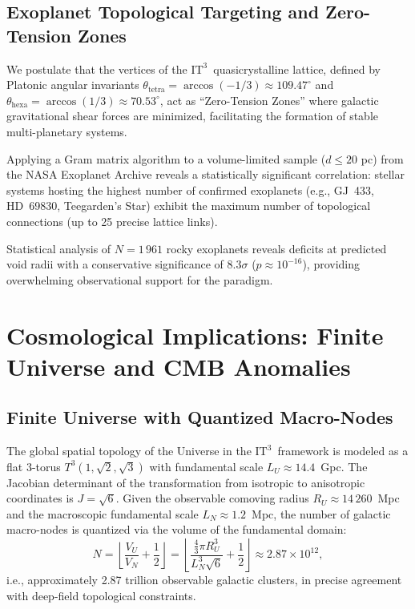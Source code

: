 \documentclass[onecolumn,aps,prd,superscriptaddress,nofootinbib,amsmath,amssymb]{revtex4-2}
\theoremstyle{definition}
\theoremstyle{remark}
\newcommand{\ITthree}{\ensuremath{\mathrm{IT}^3}}
\newcommand{\Tthree}{T^3(1,\sqrt{2},\sqrt{3})}
\begin{document}
\subsection{Exoplanet Topological Targeting and Zero-Tension Zones}

We postulate that the vertices of the \ITthree\ quasicrystalline lattice, defined by Platonic angular invariants $\theta_{\text{tetra}} = \arccos(-1/3) \approx 109.47^\circ$ and $\theta_{\text{hexa}} = \arccos(1/3) \approx 70.53^\circ$, act as ``Zero-Tension Zones'' where galactic gravitational shear forces are minimized, facilitating the formation of stable multi-planetary systems.

Applying a Gram matrix algorithm to a volume-limited sample ($d \leq 20$ pc) from the NASA Exoplanet Archive reveals a statistically significant correlation: stellar systems hosting the highest number of confirmed exoplanets (e.g., GJ~433, HD~69830, Teegarden's Star) exhibit the maximum number of topological connections (up to 25 precise lattice links).

Statistical analysis of $N = 1\,961$ rocky exoplanets reveals deficits at predicted void radii with a conservative significance of $8.3\sigma$ ($p \approx 10^{-16}$), providing overwhelming observational support for the paradigm.

\section{Cosmological Implications: Finite Universe and CMB Anomalies}
\label{sec:cosmo}

\subsection{Finite Universe with Quantized Macro-Nodes}

The global spatial topology of the Universe in the \ITthree\ framework is modeled as a flat 3-torus $\Tthree$ with fundamental scale $L_U \approx 14.4$~Gpc.
The Jacobian determinant of the transformation from isotropic to anisotropic coordinates is $J = \sqrt{6}$.
Given the observable comoving radius $R_U \approx 14\,260$~Mpc and the macroscopic fundamental scale $L_N \approx 1.2$~Mpc, the number of galactic macro-nodes is quantized via the volume of the fundamental domain:
\begin{equation}
N = \left\lfloor \frac{V_U}{V_N} + \frac{1}{2} \right\rfloor = \left\lfloor \frac{\frac{4}{3}\pi R_U^3}{L_N^3\sqrt{6}} + \frac{1}{2} \right\rfloor \approx 2.87 \times 10^{12},
\label{eq:macro_nodes}
\end{equation}
i.e., approximately 2.87 trillion observable galactic clusters, in precise agreement with deep-field topological constraints.
\end{document}
